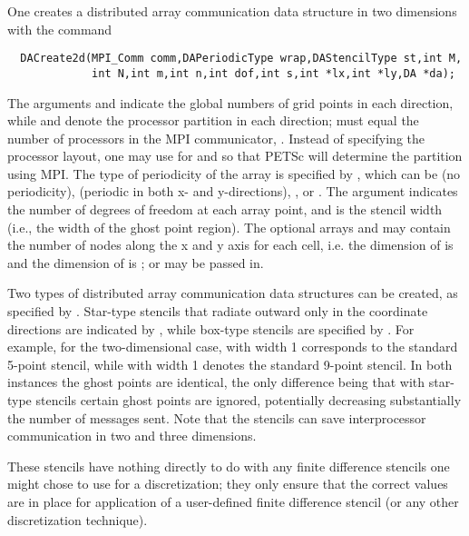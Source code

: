 One creates a distributed array communication data structure 
in two dimensions with the command 
\begin{verbatim}
  DACreate2d(MPI_Comm comm,DAPeriodicType wrap,DAStencilType st,int M,
             int N,int m,int n,int dof,int s,int *lx,int *ly,DA *da);
\end{verbatim}
The   arguments
  and  indicate the global
numbers of grid points in each direction, while  and 
denote the processor partition in each direction;  must equal
the number of processors in the MPI communicator, .  
Instead of specifying the processor layout, one may use
 for  and  
so that PETSc will determine the partition using MPI. The type of
periodicity of the array is specified by , which can be 
  (no periodicity), 
  (periodic in
both x- and y-directions),  , 
or .  The argument  
indicates the number of degrees of freedom at each array point,
and  is the stencil width (i.e., the width of the ghost point region).
The optional arrays  and  may contain the number of nodes
along the x and y axis for each cell, i.e. the dimension of  is
 and the dimension of  is ; or  
may be passed in.

Two types of distributed array communication data structures 
can be created, as specified by .
Star-type stencils that radiate outward only in the coordinate
directions are indicated by ,
 while box-type stencils are specified by
.  For example, for the
two-dimensional case,
 with width 1 corresponds to the standard 5-point
stencil, while  with width 1 denotes the
standard 9-point stencil.  In both instances the ghost points are
identical, the only difference being that with star-type stencils
certain ghost points are ignored, potentially decreasing substantially
the number of messages sent.  Note that the 
stencils can save interprocessor communication in two and three
dimensions.

These  stencils have nothing directly to do with any finite
difference stencils one might chose to use for a discretization; they
only ensure that the correct values are in place for application of a
user-defined finite difference stencil (or any other
discretization technique).


